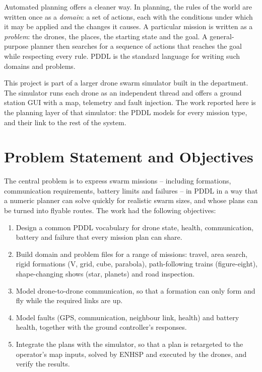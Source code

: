 \documentclass[11pt,a4paper,oneside]{report}
\begin{document}
Automated planning offers a cleaner way. In planning, the rules of the world are written once as
a \emph{domain}: a set of actions, each with the conditions under which it may be applied and the
changes it causes. A particular mission is written as a \emph{problem}: the drones, the places,
the starting state and the goal. A general-purpose planner then searches for a sequence of
actions that reaches the goal while respecting every rule. PDDL is the standard language for
writing such domains and problems.

This project is part of a larger drone swarm simulator built in the department. The simulator
runs each drone as an independent thread and offers a ground station GUI with a map, telemetry
and fault injection. The work reported here is the planning layer of that simulator: the PDDL
models for every mission type, and their link to the rest of the system.

\section{Problem Statement and Objectives}
The central problem is to express swarm missions -- including formations, communication
requirements, battery limits and failures -- in PDDL in a way that a numeric planner can solve
quickly for realistic swarm sizes, and whose plans can be turned into flyable routes. The work
had the following objectives:
\begin{enumerate}
  \item Design a common PDDL vocabulary for drone state, health, communication, battery and
        failure that every mission plan can share.
  \item Build domain and problem files for a range of missions: travel, area search, rigid
        formations (V, grid, cube, parabola), path-following trains (figure-eight), shape-changing
        shows (star, planets) and road inspection.
  \item Model drone-to-drone communication, so that a formation can only form and fly while the
        required links are up.
  \item Model faults (GPS, communication, neighbour link, health) and battery health, together
        with the ground controller's responses.
  \item Integrate the plans with the simulator, so that a plan is retargeted to the operator's map
        inputs, solved by ENHSP and executed by the drones, and verify the results.
\end{enumerate}
\end{document}

